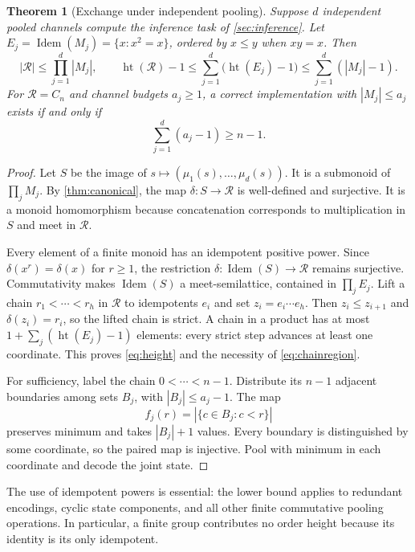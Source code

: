 \documentclass{article}
\newtheorem{theorem}{Theorem}
\theoremstyle{definition}
\newcommand{\R}{\mathcal R}
\newcommand{\height}{\operatorname{ht}}
\newcommand{\Idem}{\operatorname{Idem}}
\begin{document}
\begin{theorem}[Exchange under independent pooling]\label{thm:exchange}
Suppose $d$ independent pooled channels compute the inference task of \cref{sec:inference}. Let $E_j=\Idem(M_j)=\{x:x^2=x\}$, ordered by $x\le y$ when $xy=x$. Then
\begin{equation}
 |\R|\le\prod_{j=1}^d|M_j|,
 \qquad
 \height(\R)-1\le\sum_{j=1}^d\bigl(\height(E_j)-1\bigr)
                 \le\sum_{j=1}^d(|M_j|-1).
 \label{eq:height}
\end{equation}
For $\R=C_n$ and channel budgets $a_j\ge1$, a correct implementation with $|M_j|\le a_j$ exists if and only if
\begin{equation}
 \boxed{\ \sum_{j=1}^d(a_j-1)\ge n-1.\ }\label{eq:chainregion}
\end{equation}
\end{theorem}
\begin{proof}
Let $S$ be the image of $s\mapsto(\mu_1(s),\ldots,\mu_d(s))$. It is a submonoid of $\prod_jM_j$. By \cref{thm:canonical}, the map $\delta:S\to\R$ is well-defined and surjective. It is a monoid homomorphism because concatenation corresponds to multiplication in $S$ and meet in $\R$.

Every element of a finite monoid has an idempotent positive power. Since $\delta(x^r)=\delta(x)$ for $r\ge1$, the restriction $\delta:\Idem(S)\to\R$ remains surjective. Commutativity makes $\Idem(S)$ a meet-semilattice, contained in $\prod_jE_j$. Lift a chain $r_1<\cdots<r_h$ in $\R$ to idempotents $e_i$ and set $z_i=e_i\cdots e_h$. Then $z_i\le z_{i+1}$ and $\delta(z_i)=r_i$, so the lifted chain is strict. A chain in a product has at most $1+\sum_j(\height(E_j)-1)$ elements: every strict step advances at least one coordinate. This proves \eqref{eq:height} and the necessity of \eqref{eq:chainregion}.

For sufficiency, label the chain $0<\cdots<n-1$. Distribute its $n-1$ adjacent boundaries among sets $B_j$, with $|B_j|\le a_j-1$. The map
\begin{equation}
 f_j(r)=|\{c\in B_j:c<r\}|\label{eq:cuts}
\end{equation}
preserves minimum and takes $|B_j|+1$ values. Every boundary is distinguished by some coordinate, so the paired map is injective. Pool with minimum in each coordinate and decode the joint state.
\end{proof}

The use of idempotent powers is essential: the lower bound applies to redundant encodings, cyclic state components, and all other finite commutative pooling operations. In particular, a finite group contributes no order height because its identity is its only idempotent.
\end{document}
